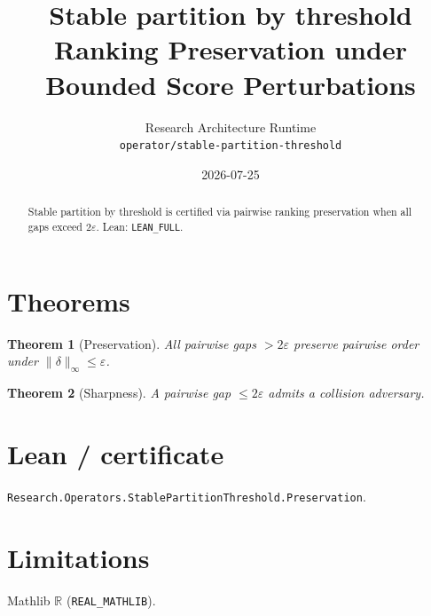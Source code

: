 \documentclass[11pt]{article}
\title{Stable partition by threshold Ranking Preservation under Bounded Score Perturbations}
\author{Research Architecture Runtime \\ \texttt{operator/stable-partition-threshold}}
\date{2026-07-25}
\newtheorem{theorem}{Theorem}
\begin{document}
\maketitle
\begin{abstract}
Stable partition by threshold is certified via pairwise ranking preservation when all gaps exceed $2\varepsilon$. Lean: \texttt{LEAN\_FULL}.
\end{abstract}
\section{Theorems}
\begin{theorem}[Preservation]
All pairwise gaps $>2\varepsilon$ preserve pairwise order under $\|\delta\|_\infty\le\varepsilon$.
\end{theorem}
\begin{theorem}[Sharpness]
A pairwise gap $\le 2\varepsilon$ admits a collision adversary.
\end{theorem}
\section{Lean / certificate}
\texttt{Research.Operators.StablePartitionThreshold.Preservation}.
\section{Limitations}
Mathlib $\mathbb{R}$ (\texttt{REAL\_MATHLIB}).
\end{document}
